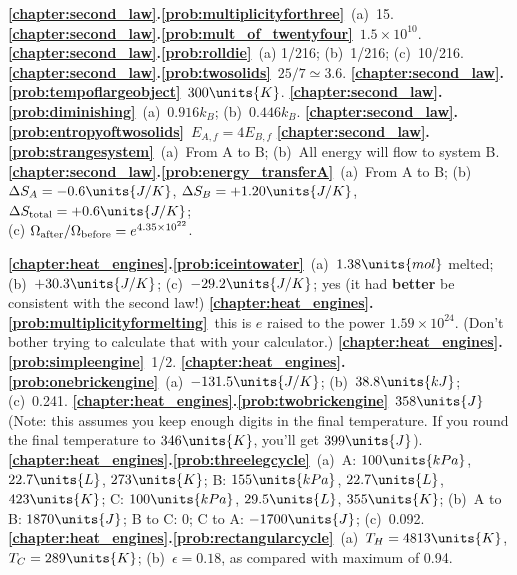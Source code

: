 
\noindent
{\bf \ref{chapter:second_law}.\ref{prob:multiplicityforthree}}~(a)~15.
{\bf \ref{chapter:second_law}.\ref{prob:mult_of_twentyfour}}~$1.5 \times 10^{10}$.
{\bf \ref{chapter:second_law}.\ref{prob:rolldie}}~(a) 1/216; (b)~1/216; 
(c)~10/216.
{\bf \ref{chapter:second_law}.\ref{prob:twosolids}}~$25/7 \simeq 3.6$.
{\bf \ref{chapter:second_law}.\ref{prob:tempoflargeobject}}~$300\units{K}$.
{\bf \ref{chapter:second_law}.\ref{prob:diminishing}}~(a)~$0.916 k_B$; 
(b)~$0.446 k_B$.
{\bf \ref{chapter:second_law}.\ref{prob:entropyoftwosolids}}~$E_{A,f}=4E_{B,f}$
{\bf \ref{chapter:second_law}.\ref{prob:strangesystem}}~(a)~From A to B; 
(b)~All energy will flow to system B.
{\bf \ref{chapter:second_law}.\ref{prob:energy_transferA}}~(a)~From A to B;
(b) $\Delta S_A = -0.6\units{J/K}$, $\Delta S_B = +1.20\units{J/K}$, 
$\Delta S_{\rm total} = +0.6\units{J/K}$;\\
(c) $\Omega_{\rm after}/\Omega_{\rm before} = e^{4.35\times 10^{22}}$.
 
\medskip


\noindent
{\bf \ref{chapter:heat_engines}.\ref{prob:iceintowater}}~(a)~$1.38\units{mol}$ 
melted; (b)~$+30.3\units{J/K}$; (c)~$-29.2\units{J/K}$; yes (it had 
{\bf better} be consistent with the second law!)
{\bf \ref{chapter:heat_engines}.\ref{prob:multiplicityformelting}}~this is 
$e$  raised to the power $1.59\times 10^{24}$.  (Don't bother trying to 
calculate that with your calculator.)
{\bf \ref{chapter:heat_engines}.\ref{prob:simpleengine}}~1/2.
{\bf \ref{chapter:heat_engines}.\ref{prob:onebrickengine}}~(a)~$-131.5\units{J/K}$; 
(b)~$38.8\units{kJ}$; (c)~0.241.
{\bf \ref{chapter:heat_engines}.\ref{prob:twobrickengine}}~$358\units{J}$ 
(Note:  this assumes you keep enough digits in the final temperature.  
If you round the final temperature to $346\units{K}$, you'll get 
$399\units{J}$).
{\bf \ref{chapter:heat_engines}.\ref{prob:threelegcycle}}~(a)~A:  
$100\units{kPa}$, $22.7\units{L}$, $273\units{K}$; B: $155\units{kPa}$, 
$22.7\units{L}$, $423\units{K}$; C: $100\units{kPa}$, $29.5\units{L}$, 
$355\units{K}$; (b)~A to B:  $1870\units{J}$; B to C:  0; C to A:  
$-1700\units{J}$; (c)~0.092.
{\bf \ref{chapter:heat_engines}.\ref{prob:rectangularcycle}}~(a)~$T_H = 
4813\units{K}$, $T_C = 289\units{K}$; (b)~$\epsilon = 0.18$, as 
compared with maximum of 0.94.

\medskip
\newpage

